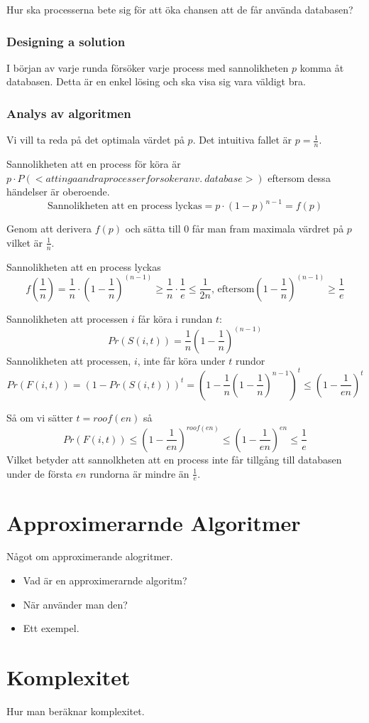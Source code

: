 \documentclass[a4paper]{report}
\begin{document}
Hur ska processerna bete sig för att öka chansen att de får använda databasen?
\subsubsection{Designing a solution}
I början av varje runda försöker varje process med sannolikheten $p$ komma åt
databasen. Detta är en enkel lösing och ska visa sig vara väldigt bra.

\subsubsection{Analys av algoritmen}
Vi vill ta reda på det optimala värdet på $p$. Det intuitiva fallet är $p = \frac{1}{n}$.

Sannolikheten att en process för köra är $p \cdot P(<att inga andra processer
forsoker anv.\ database>)$ eftersom dessa händelser är oberoende.
\begin{equation}
	\mbox{Sannolikheten att en process lyckas} = p \cdot (1 - p)^{n - 1} = f(p)
\end{equation}

Genom att derivera $f(p)$ och sätta till $0$ får man fram maximala värdret på
$p$ vilket är $\frac{1}{n}$.

Sannolikheten att en process lyckas
\begin{equation}
	f(\frac{1}{n}) = \frac{1}{n} \cdot (1 - \frac{1}{n})^{(n-1)} \geq
	\frac{1}{n} \cdot \frac{1}{e} \leq \frac{1}{2n}\mbox{, eftersom} (1 -
	\frac{1}{n})^{(n-1)} \geq \frac{1}{e}
\end{equation}

Sannolikheten att processen $i$ får köra i rundan $t$:
\begin{equation}
	Pr(S(i,t)) = \frac{1}{n}(1 - \frac{1}{n})^{(n-1)}
\end{equation}
Sannolikheten att processen, $i$, inte får köra under $t$ rundor
\begin{equation}
	Pr(F(i,t)) = (1 - Pr(S(i,t)))^t = (1 - \frac{1}{n}(1 -
	\frac{1}{n})^{n-1})^t \leq (1 - \frac{1}{en})^t
\end{equation}

Så om vi sätter $t = roof(en)$ så
\begin{equation}
	Pr(F(i,t)) \leq (1 - \frac{1}{en})^{roof(en)} \leq (1 - \frac{1}{en})^{en} \leq
	\frac{1}{e}
\end{equation}
Vilket betyder att sannolkheten att en process inte får tillgång till databasen
under de första $en$ rundorna är mindre än $\frac{1}{e}$.


\section{Approximerarnde Algoritmer}

Något om approximerande alogritmer.
\begin{itemize}
	\item Vad är en approximerarnde algoritm?
	\item När använder man den?
	\item Ett exempel.
\end{itemize}

\section{Komplexitet}
Hur man beräknar komplexitet.
\end{document}
